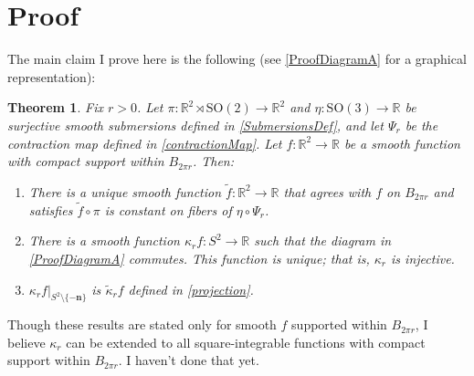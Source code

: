 \documentclass[a4paper,11pt]{scrartcl}
\newcounter{dummy}
\numberwithin{dummy}{section}
\theoremstyle{plain}
\theoremstyle{plain}
\theoremstyle{plain}
\theoremstyle{plain}
\newtheorem{theorem}[dummy]{Theorem}
\theoremstyle{nonumberplain}
\newcommand{\F}[1][R]{\mathbb{#1}} %
\newcommand{\SO}{\mathrm{SO}}
\begin{document}
	\section{Proof}
	The main claim I prove here is the following (see \autoref{ProofDiagramA} for a graphical representation):
	\begin{theorem}
	    Fix $ r > 0 $. 
	    Let $ \pi : \F^{2} \rtimes \SO(2) \to \F^{2} $ and $ \eta : \SO(3) \to \F $ be surjective smooth submersions defined in \eqref{SubmersionsDef}, and let $ \Psi_{r} $ be the contraction map defined in \eqref{contractionMap}.
	    Let $ f : \F^{2} \to \F $ be a smooth function with compact support within $ B_{2 \pi r} $. Then:
	    \begin{enumerate}[label=(\roman*)]
	        \item There is a unique smooth function $ \widetilde{f} : \F^{2} \to \F  $ that agrees with $ f $ on $ B_{2 \pi r} $ and satisfies $ \widetilde{f} \circ \pi $ is constant on fibers of $ \eta \circ \Psi_{r} $.
	        
	        \item There is a smooth function $ \kappa_{r} f : S^{2} \to \F $ such that the diagram in \autoref{ProofDiagramA} commutes. This function is unique; that is, $ \kappa_{r} $ is injective.
	        
	        \item $ \kappa_{r} f \big|_{S^{2} \setminus \{- \mathbf{n} \} } $ is $ \widetilde{\kappa}_{r} f $ defined in \eqref{projection}.
	        \end{enumerate}
	\end{theorem}
	
	Though these results are stated only for smooth $ f $ supported within $ B_{2 \pi r} $, I believe $ \kappa_{r} $ can be extended to all square-integrable functions with compact support within $ B_{2 \pi r} $. I haven't done that yet.
	
\end{document}
